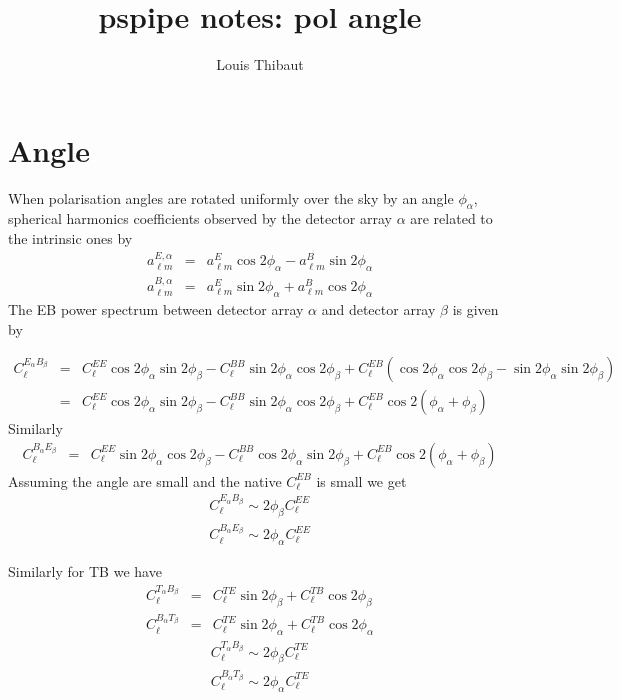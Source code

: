 \documentclass[a4paper, 11pt]{article}
\def\ba{\begin{eqnarray}}
\def\ea{\end{eqnarray}}
\begin{document}
\title{\textbf{pspipe notes: pol angle}}
\author{Louis Thibaut}
\maketitle

\section{Angle} 

When polarisation angles are rotated uniformly over the sky by an angle $\phi_{\alpha}$, spherical harmonics coefficients observed by the detector array $\alpha$ are related to the intrinsic ones by
\ba
a^{E, \alpha}_{\ell m} &=& a^{E}_{\ell m} \cos 2\phi_{\alpha} -  a^{B}_{\ell m} \sin 2\phi_{\alpha} \\
a^{B, \alpha}_{\ell m} &=& a^{E}_{\ell m} \sin 2\phi_{\alpha} +  a^{B}_{\ell m} \cos 2\phi_{\alpha}
\ea
The EB power spectrum between detector array $\alpha$ and detector array $\beta$ is given by

\ba
C^{E_{\alpha} B_{\beta}}_{\ell} &=& C^{EE}_{\ell} \cos 2\phi_{\alpha}  \sin 2\phi_{\beta} - C^{BB}_{\ell} \sin 2\phi_{\alpha}  \cos 2\phi_{\beta} + C^{EB}_{\ell}(\cos 2\phi_{\alpha} \cos 2\phi_{\beta} -  \sin 2\phi_{\alpha}  \sin 2\phi_{\beta}) \nonumber \\
&=&  C^{EE}_{\ell} \cos 2\phi_{\alpha}  \sin 2\phi_{\beta} - C^{BB}_{\ell} \sin 2\phi_{\alpha}  \cos 2\phi_{\beta} + C^{EB}_{\ell}  \cos 2 (\phi_{\alpha} + \phi_{\beta})
\ea
Similarly
\ba
C^{B_{\alpha} E_{\beta}}_{\ell}  &=&  C^{EE}_{\ell} \sin 2\phi_{\alpha}  \cos 2\phi_{\beta} - C^{BB}_{\ell} \cos 2\phi_{\alpha}  \sin 2\phi_{\beta} + C^{EB}_{\ell}  \cos 2 (\phi_{\alpha} + \phi_{\beta})
\ea
Assuming the angle are small and the native $C^{EB}_{\ell}$  is small we get
\ba
C^{E_{\alpha} B_{\beta}}_{\ell}  \sim 2\phi_{\beta}C^{EE}_{\ell}   \\
C^{B_{\alpha} E_{\beta}}_{\ell}  \sim 2\phi_{\alpha}C^{EE}_{\ell}   
\ea

Similarly for TB we have
\ba
C^{T_{\alpha} B_{\beta}}_{\ell} &=& C^{TE}_{\ell}  \sin 2\phi_{\beta} + C^{TB}_{\ell}   \cos 2\phi_{\beta} \\
C^{B_{\alpha} T_{\beta}}_{\ell} &=& C^{TE}_{\ell}  \sin 2\phi_{\alpha} + C^{TB}_{\ell}   \cos 2\phi_{\alpha}
\ea
\ba
C^{T_{\alpha} B_{\beta}}_{\ell} \sim 2\phi_{\beta}C^{TE}_{\ell}      \\
C^{B_{\alpha} T_{\beta}}_{\ell}  \sim 2\phi_{\alpha}C^{TE}_{\ell}      
\ea
\end{document}
